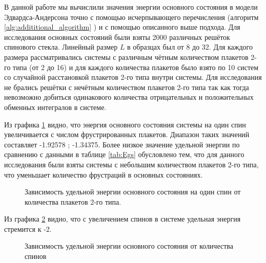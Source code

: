 \documentclass[utf8, babel, sor, jor, amsmath, amssymb, reprint]{elsarticle} %
\begin{document}
В данной работе мы вычислили значения энергии основного состояния в модели Эдвардса-Андерсона точно с помощью исчерпывающего перечисления (алгоритм \ref{alg:addititional_algorithm}
) и с помощью описанного выше подхода. Для исследования основных состояний были взяты 2000 различных решёток спинового стекла. Линейный размер $L$ в образцах был от 8 до 32.
Для каждого размера рассматривались системы с различным чётным количеством плакетов 2-го типа (от 2 до 16) и для каждого количества плакетов было взято по 10 систем со случайной расстановкой плакетов 2-го типа внутри системы. Для исследования не  брались решётки с нечётным количеством плакетов 2-го типа так как тогда невозможно добиться одинакового количества отрицательных и положительных обменных интегралов в системе. 

Из графика \ref{fig:Egs_N_F} видно, что энергия основного состояния системы на один спин увеличивается с числом фрустрированных плакетов. Диапазон таких значений составляет -1.92578 ; -1.34375. Более низкое значение удельной энергии по сравнению с данными в таблице \ref{tab:Egs} обусловлено тем, что для данного исследования были взяты системы с небольшим количеством плакетов 2-го типа, что уменьшает количество фрустраций в основных состояниях.

\begin{figure}[H]
	\centering
	\caption{Зависимость удельной энергии основного состояния на один спин от количества плакетов 2-го типа.}
	\label{fig:Egs_N_F}
\end{figure}

Из графика \ref{fig:Egs____N_F} видно, что с увеличением спинов в системе удельная энергия стремится к -2.

\begin{figure}[H]
	\centering
	\caption{Зависимость удельной энергии основного состояния от количества спинов}
	\label{fig:Egs____N_F}
\end{figure}
\end{document}
